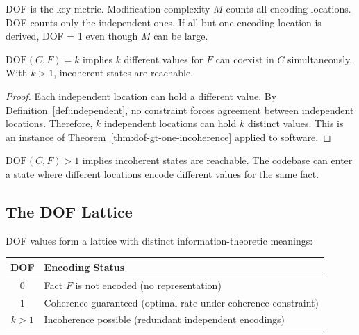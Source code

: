 DOF is the key metric. Modification complexity $M$ counts all encoding locations. DOF counts only the independent ones. If all but one encoding location is derived, DOF = 1 even though $M$ can be large.

\begin{theorem}[DOF = Incoherence Potential]\label{thm:dof-inconsistency}
$\text{DOF}(C, F) = k$ implies $k$ different values for $F$ can coexist in $C$ simultaneously. With $k > 1$, incoherent states are reachable.
\end{theorem}

\begin{proof}
Each independent location can hold a different value. By Definition~\ref{def:independent}, no constraint forces agreement between independent locations. Therefore, $k$ independent locations can hold $k$ distinct values. This is an instance of Theorem~\ref{thm:dof-gt-one-incoherence} applied to software.
\end{proof}

\begin{corollary}\label{cor:dof-risk}
$\text{DOF}(C, F) > 1$ implies incoherent states are reachable. The codebase can enter a state where different locations encode different values for the same fact.
\end{corollary}

\subsection{The DOF Lattice}\label{sec:dof-lattice}

DOF values form a lattice with distinct information-theoretic meanings:

\begin{center}
\begin{tabularx}{\linewidth}{cX}
\toprule
\textbf{DOF} & \textbf{Encoding Status} \\
\midrule
0 & Fact $F$ is not encoded (no representation) \\
1 & Coherence guaranteed (optimal rate under coherence constraint) \\
$k > 1$ & Incoherence possible (redundant independent encodings) \\
\bottomrule
\end{tabularx}
\end{center}

